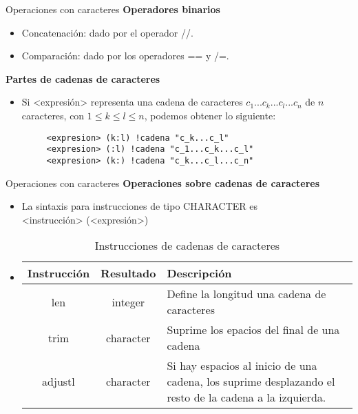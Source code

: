 \begin{frame}[fragile]{Operaciones con caracteres}
\textbf{Operadores binarios}
 \begin{itemize}[<+(1)->]  
    \item Concatenación: dado por el operador //.
    \item Comparación: dado por los operadores == y /=.
 \end{itemize}

\textbf{Partes de cadenas de caracteres}
 \begin{itemize}[<+(2)->]  
    \item Si <expresión> representa una cadena de caracteres $c_{1}...c_{k}...c_{l}...c_{n}$ de $n$ caracteres, con $1 \leq k \leq l \leq n$, podemos obtener lo siguiente:
    \vspace{0.2cm} 
    \begin{verbatim}
     <expresion> (k:l) !cadena "c_k...c_l"
     <expresion> (:l) !cadena "c_1...c_k...c_l"
     <expresion> (k:) !cadena "c_k...c_l...c_n"
     \end{verbatim}  
 \end{itemize}
\end{frame}

\begin{frame}[fragile]{Operaciones con caracteres}
\textbf{Operaciones sobre cadenas de caracteres}
 \begin{itemize}[<+(1)->]
  \item La sintaxis para instrucciones de tipo CHARACTER es \\
    \centering <instrucción> (<expresión>)
  \item []
  \begin{table}[]
    \centering
    \label{Tabla_funcionesintr}
    \resizebox{10.5cm}{!} {
    \begin{tabular}{|c|c|p{6cm}|}
    \hline
    Instrucción  & Resultado  & Descripción                                                                                                    \\ \hline
    len          & integer    & Define la longitud una cadena de caracteres                                                                    \\ \hline
    trim         & character  & Suprime los epacios del final de una cadena                                                                    \\ \hline
    adjustl      & character  & Si hay espacios al inicio de una cadena, los suprime desplazando el resto de la cadena a la izquierda.        \\ \hline
    \end{tabular}}
    \caption*{Instrucciones de cadenas de caracteres}
    \end{table}
 \end{itemize}
\end{frame}


